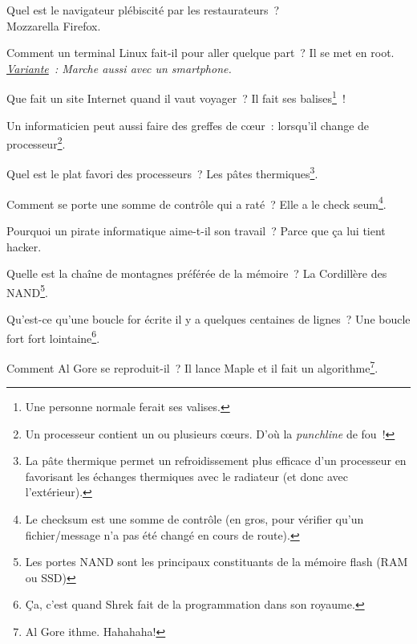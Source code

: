 \documentclass[10pt,a5paper,fullpage]{book}
\begin{document}
\begin{enumerate}
{		\item Quel est le navigateur plébiscité par les restaurateurs~? \\Mozzarella Firefox.
		\item Comment un terminal Linux fait-il pour aller quelque part~? Il se met en root.
		\\\textit{\underline{Variante}~: Marche aussi avec un smartphone.} 
		\item Que fait un site Internet quand il vaut voyager~? Il fait ses balises\footnote{Une personne normale ferait ses valises.}~!
		\item Un informaticien peut aussi faire des greffes de cœur~: lorsqu’il change de processeur\footnote{Un processeur contient un ou plusieurs cœurs. D’où la \textit{punchline} de fou~!}.
		\item Quel est le plat favori des processeurs~? Les pâtes thermiques\footnote{La pâte thermique permet un refroidissement plus efficace d’un processeur en favorisant les échanges thermiques avec le radiateur (et donc avec l’extérieur).}.
		\item Comment se porte une somme de contrôle qui a raté~? Elle a le check seum\footnote{Le checksum est une somme de contrôle (en gros, pour vérifier qu’un fichier/message n’a pas été changé en cours de route).}.
		\item Pourquoi un pirate informatique aime-t-il son travail~? Parce que ça lui tient hacker.
		\item Quelle est la chaîne de montagnes préférée de la mémoire~? La Cordillère des NAND\footnote{Les portes NAND sont les principaux constituants de la mémoire flash (RAM ou SSD)}.
		\item Qu’est-ce qu’une boucle for écrite il y a quelques centaines de lignes~? Une boucle fort fort lointaine\footnote{Ça, c’est quand Shrek fait de la programmation dans son royaume.}.
		\item Comment Al Gore se reproduit-il~? Il lance Maple et il fait un algorithme\footnote{Al Gore ithme. Hahahaha!}.
}
\end{enumerate}
\end{document}
